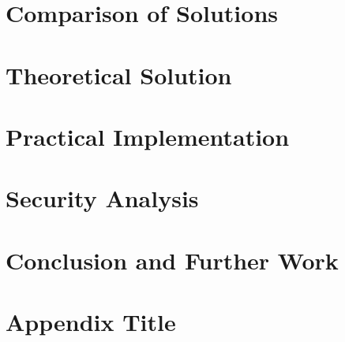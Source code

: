 \documentclass[10pt]{report}
\begin{document}
\chapter{Comparison of Solutions}




\chapter{Theoretical Solution}





\chapter{Practical Implementation}

\chapter{Security Analysis}

\chapter{Conclusion and Further Work}

\appendix
\chapter{Appendix Title}


\fi
\begin{sloppypar}
\printbibliography
\end{sloppypar}
\end{document}
